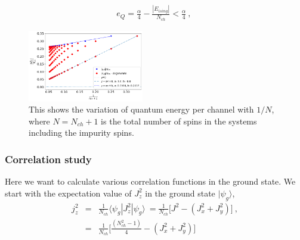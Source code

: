 \documentclass[reprint,prb,superscriptaddress]{revtex4-2}
\begin{document}
\begin{eqnarray}
e_Q = \frac{\alpha}{4}- \frac{|E_{ising}|}{N_{ch}} < \frac{\alpha}{4}~,~
\end{eqnarray}

\begin{figure}[!htpb]
\centering
\includegraphics[width=0.45\textwidth]{plt/Quantum_Energy_per_channel}
\caption{This shows the variation of quantum energy per channel with $1/N$, where $N=N_{ch}+1$ is the total number of spins in the systems including the impurity spins. }
\end{figure}


\subsubsection{Correlation study}
Here we want to calculate various correlation functions in the ground state. We start with the expectation value of $J_z^2$ in the ground state $|\psi_g\rangle$,
\begin{eqnarray}
j_z^2&=&\frac{1}{N_{ch}}\langle \psi_g | J_z^2 | \psi_g \rangle~=\frac{1}{N_{ch}} \bigg[ J^2-(J_x^2+J_y^2) \bigg] ~,\nonumber\\
&=& \frac{1}{N_{ch}} \bigg[ \frac{(N_{ch}^2-1)}{4}-(J_x^2+J_y^2) \bigg]
\end{eqnarray}
\end{document}
